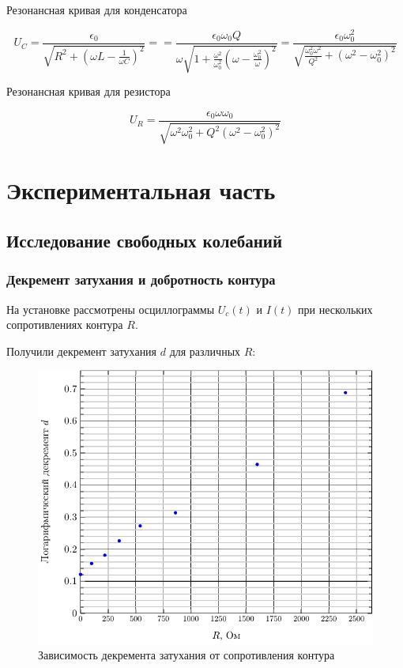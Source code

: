 \begin{center}
Резонансная кривая для конденсатора
\end{center}

\begin{equation}
	U_C=\frac{\epsilon_0}{\sqrt{R^2+(\omega L-\frac{1}{\omega C})^2}}=
		=\frac{\epsilon_0\omega_0 Q}
			{\omega \sqrt{1+\frac{\omega^2}{\omega_0^2}(\omega-\frac{\omega_0^2}{\omega})^2}}
		=\frac{\epsilon_0\omega_0^2}{\sqrt{\frac{\omega_0^2\omega^2}{Q^2}+(\omega^2-\omega_0^2)^2}}
\end{equation}

\begin{center}
Резонансная кривая для резистора
\end{center}
\begin{equation}
	U_R=\frac{\epsilon_0\omega\omega_0}{\sqrt{\omega^2\omega_0^2+Q^2(\omega^2-\omega_0^2)^2}}
\end{equation}
\newpage

\section{Экспериментальная часть}
\subsection{Исследование свободных колебаний}
\subsubsection{Декремент затухания и добротность контура}
На установке рассмотрены осциллограммы $U_c(t)$ и $I(t)$ при нескольких сопротивлениях контура $R$. 

Получили декремент затухания $d$ для различных $R$:
\begin{figure}[H]
	\centering
	\includegraphics[]{plot/1c}
	\caption{Зависимость декремента затухания от сопротивления контура}
	\label{fig:figure1}
\end{figure}

